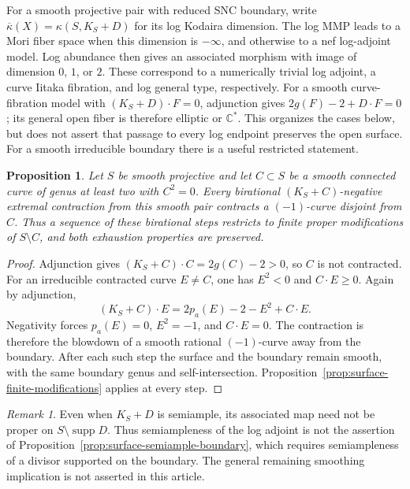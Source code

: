 \documentclass[11pt]{amsart}
\newtheorem{proposition}[theorem]{Proposition}
\theoremstyle{definition}
\theoremstyle{remark}
\newtheorem{remark}[theorem]{Remark}
\numberwithin{equation}{section}
\newcommand{\C}{\mathbb C}
\newcommand{\supp}{\operatorname{supp}}
\begin{document}
For a smooth projective pair with reduced SNC boundary, write
$\overline\kappa(X)=\kappa(S,K_S+D)$ for its log Kodaira dimension.
The log MMP leads to a Mori fiber space when this dimension is
$-\infty$, and otherwise to a nef log-adjoint model.  Log abundance
then gives an associated morphism with image of dimension $0$, $1$,
or $2$.  These correspond to a numerically trivial log adjoint,
a curve Iitaka fibration, and log general type, respectively.
For a smooth curve-fibration model with $(K_S+D)\cdot F=0$, adjunction
gives $2g(F)-2+D\cdot F=0$; its general open fiber is therefore
elliptic or $\C^*$.  This organizes the cases below, but does not
assert that passage to every log endpoint preserves the open surface.
For a smooth irreducible boundary there is a useful restricted statement.
\begin{proposition}\label{prop:surface-smooth-boundary-negative-steps}
Let $S$ be smooth projective and let $C\subset S$ be a smooth connected
curve of genus at least two with $C^2=0$.  Every birational
$(K_S+C)$-negative extremal contraction from this smooth pair contracts
a $(-1)$-curve disjoint from $C$.  Thus a sequence of these birational
steps restricts to finite proper modifications of $S\setminus C$,
and both exhaustion properties are preserved.
\end{proposition}
\begin{proof}
Adjunction gives $(K_S+C)\cdot C=2g(C)-2>0$, so $C$ is not contracted.
For an irreducible contracted curve $E\ne C$, one has $E^2<0$ and
$C\cdot E\ge0$.  Again by adjunction,
\[
 (K_S+C)\cdot E=2p_a(E)-2-E^2+C\cdot E.
\]
Negativity forces $p_a(E)=0$, $E^2=-1$, and $C\cdot E=0$.
The contraction is therefore the blowdown of a smooth rational
$(-1)$-curve away from the boundary.  After each such step the surface
and the boundary remain smooth, with the same boundary genus and
self-intersection.  Proposition~\ref{prop:surface-finite-modifications}
applies at every step.
\end{proof}

\begin{remark}\label{rem:surface-log-adjoint-not-exhaustion}
Even when $K_S+D$ is semiample, its associated map need not be proper
on $S\setminus\supp D$.  Thus semiampleness of the log adjoint is not
the assertion of Proposition~\ref{prop:surface-semiample-boundary},
which requires semiampleness of a divisor supported on the boundary.
The general remaining smoothing implication is not asserted in this
article.
\end{remark}
\end{document}
